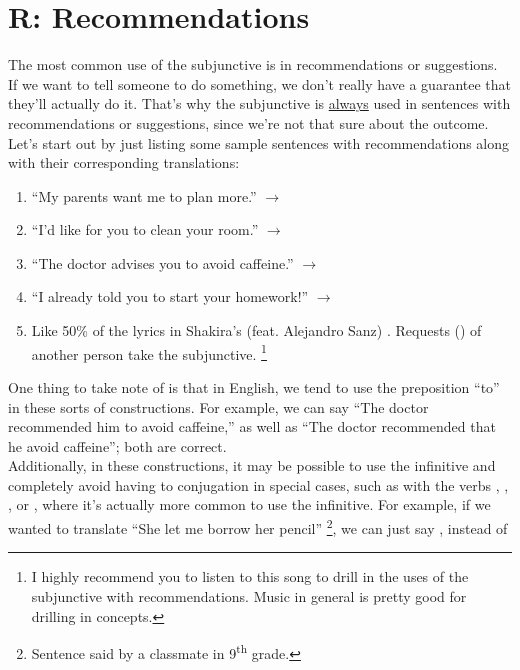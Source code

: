 \section{R: Recommendations}

The most common use of the subjunctive is in recommendations or suggestions. \\

If we want to tell someone to do something, we don't really have a guarantee that they'll actually do it. That's why the subjunctive is \underline{always} used in sentences with recommendations or suggestions, since we're not that sure about the outcome.\\

Let's start out by just listing some sample sentences with recommendations along with their corresponding translations:
\begin{enumerate}[noitemsep]
	\item ``My parents want me to plan more.'' $\rightarrow$ 
	\item ``I'd like for you to clean your room.'' $\rightarrow$ 
	\item ``The doctor advises you to avoid caffeine.'' $\rightarrow$ 
	\item ``I already told you to start your homework!'' $\rightarrow$ 
	\item Like 50\% of the lyrics in Shakira's (feat. Alejandro Sanz) . Requests () of another person take the subjunctive.  \footnote{I highly recommend you to listen to this song to drill in the uses of the subjunctive with recommendations. Music in general is pretty good for drilling in concepts. }
\end{enumerate}

One thing to take note of is that in English, we tend to use the preposition ``to'' in these sorts of constructions. For example, we can say ``The doctor recommended him to avoid caffeine,'' as well as ``The doctor recommended that he avoid caffeine''; both are correct.\\ 

Additionally, in these constructions, it may be possible to use the infinitive and completely avoid having to conjugation in special cases, such as with the verbs ,  , , or , where it's actually more common to use the infinitive. For example, if we wanted to translate ``She let me borrow her pencil'' \footnote{Sentence said by a classmate in 9\textsuperscript{th} grade.}, we can just say , instead of 
